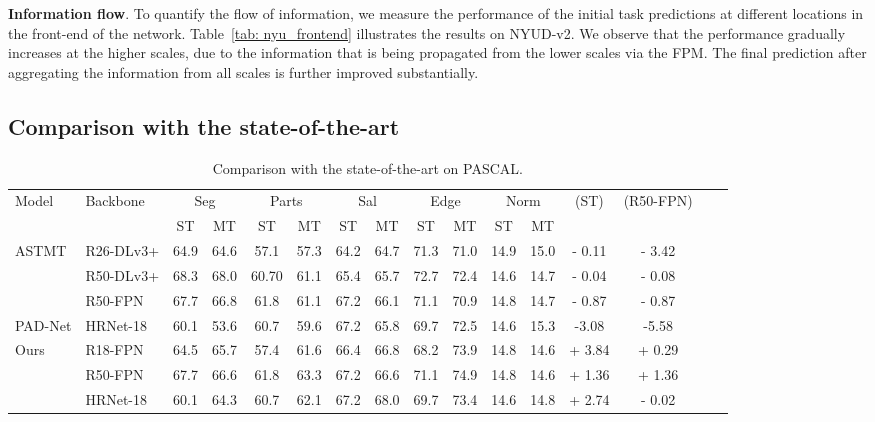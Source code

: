 \documentclass[runningheads]{llncs}
\begin{document}
\noindent\textbf{Information flow}.
To quantify the flow of information, we measure the performance of the initial task predictions at different locations in the front-end of the network. Table~\ref{tab: nyu_frontend} illustrates the results on NYUD-v2. We observe that the performance gradually increases at the higher scales, due to the information that is being propagated from the lower scales via the FPM. The final prediction after aggregating the information from all scales is further improved substantially. 

\subsection{Comparison with the state-of-the-art}
\label{sec:sota}

\begin{table}[t]
\caption{Comparison with the state-of-the-art on PASCAL.}
\label{tab: sota_pascal}
\centering
\tiny{
\begin{tabular}{|l|l|c|c|c|c|c|c|c|c|c|c|c|c|c|c|}
\hline
\multirow{2}{*}{Model} & \multirow{2}{*}{Backbone} & \multicolumn{2}{|c|}{Seg } & \multicolumn{2}{|c|}{Parts } & \multicolumn{2}{|c|}{Sal } & \multicolumn{2}{|c|}{Edge } & \multicolumn{2}{|c|}{Norm } & \multirow{2}{*}{  (ST)} & \multirow{2}{*}{  (R50-FPN)}\\ \cline{3-12}
& & ST & MT & ST & MT & ST & MT & ST & MT & ST & MT & & \\
\hline
\multirow{3}{*}{ASTMT \cite{maninis2019attentive}} & R26-DLv3+ & 64.9 & 64.6 & 57.1 & 57.3 & 64.2 & 64.7 & 71.3 & 71.0 & 14.9 & 15.0 & - 0.11 & - 3.42 \\
& R50-DLv3+ & 68.3 & 68.0 & 60.70 & 61.1 & 65.4 & 65.7 & 72.7 & 72.4 & 14.6 & 14.7 & - 0.04 & - 0.08 \\
& R50-FPN & 67.7 & 66.8 & 61.8 & 61.1 & 67.2 & 66.1 & 71.1 & 70.9 & 14.8 & 14.7 & - 0.87 & - 0.87 \\
\hline
PAD-Net\cite{xu2018pad} & HRNet-18 & 60.1 & 53.6 & 60.7 & 59.6 & 67.2 & 65.8 & 69.7 & 72.5 & 14.6 & 15.3 & -3.08 & -5.58 \\
\hline
\multirow{3}{*}{Ours} & R18-FPN & 64.5 & 65.7 & 57.4 & 61.6 & 66.4 & 66.8 & 68.2 & 73.9 & 14.8 & 14.6 & + 3.84 & + 0.29 \\
& R50-FPN & 67.7 & 66.6 & 61.8 & 63.3 & 67.2 & 66.6 & 71.1 & 74.9 & 14.8 & 14.6 & + 1.36 & + 1.36 \\
& HRNet-18 & 60.1 & 64.3 & 60.7 & 62.1 & 67.2 & 68.0 & 69.7 & 73.4 & 14.6 & 14.8 & + 2.74 & - 0.02 \\
\hline
\end{tabular}}
\end{table}
\end{document}
